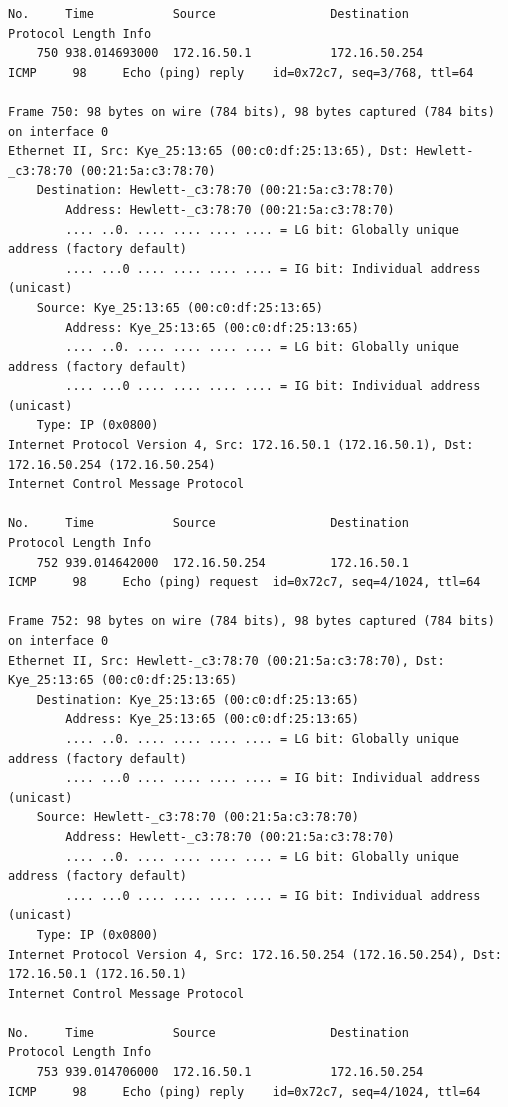 \documentclass[a4paper,11pt]{article}
\begin{document}
\begin{lstlisting}
No.     Time           Source                Destination           Protocol Length Info
    750 938.014693000  172.16.50.1           172.16.50.254         ICMP     98     Echo (ping) reply    id=0x72c7, seq=3/768, ttl=64

Frame 750: 98 bytes on wire (784 bits), 98 bytes captured (784 bits) on interface 0
Ethernet II, Src: Kye_25:13:65 (00:c0:df:25:13:65), Dst: Hewlett-_c3:78:70 (00:21:5a:c3:78:70)
    Destination: Hewlett-_c3:78:70 (00:21:5a:c3:78:70)
        Address: Hewlett-_c3:78:70 (00:21:5a:c3:78:70)
        .... ..0. .... .... .... .... = LG bit: Globally unique address (factory default)
        .... ...0 .... .... .... .... = IG bit: Individual address (unicast)
    Source: Kye_25:13:65 (00:c0:df:25:13:65)
        Address: Kye_25:13:65 (00:c0:df:25:13:65)
        .... ..0. .... .... .... .... = LG bit: Globally unique address (factory default)
        .... ...0 .... .... .... .... = IG bit: Individual address (unicast)
    Type: IP (0x0800)
Internet Protocol Version 4, Src: 172.16.50.1 (172.16.50.1), Dst: 172.16.50.254 (172.16.50.254)
Internet Control Message Protocol

No.     Time           Source                Destination           Protocol Length Info
    752 939.014642000  172.16.50.254         172.16.50.1           ICMP     98     Echo (ping) request  id=0x72c7, seq=4/1024, ttl=64

Frame 752: 98 bytes on wire (784 bits), 98 bytes captured (784 bits) on interface 0
Ethernet II, Src: Hewlett-_c3:78:70 (00:21:5a:c3:78:70), Dst: Kye_25:13:65 (00:c0:df:25:13:65)
    Destination: Kye_25:13:65 (00:c0:df:25:13:65)
        Address: Kye_25:13:65 (00:c0:df:25:13:65)
        .... ..0. .... .... .... .... = LG bit: Globally unique address (factory default)
        .... ...0 .... .... .... .... = IG bit: Individual address (unicast)
    Source: Hewlett-_c3:78:70 (00:21:5a:c3:78:70)
        Address: Hewlett-_c3:78:70 (00:21:5a:c3:78:70)
        .... ..0. .... .... .... .... = LG bit: Globally unique address (factory default)
        .... ...0 .... .... .... .... = IG bit: Individual address (unicast)
    Type: IP (0x0800)
Internet Protocol Version 4, Src: 172.16.50.254 (172.16.50.254), Dst: 172.16.50.1 (172.16.50.1)
Internet Control Message Protocol

No.     Time           Source                Destination           Protocol Length Info
    753 939.014706000  172.16.50.1           172.16.50.254         ICMP     98     Echo (ping) reply    id=0x72c7, seq=4/1024, ttl=64


\end{lstlisting}
\end{document}
